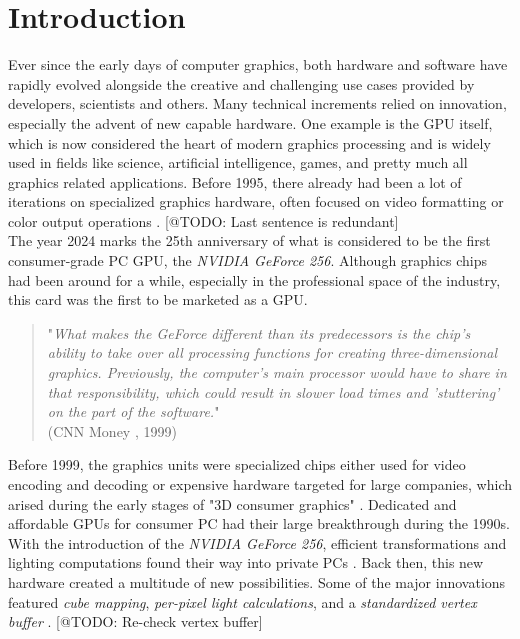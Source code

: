 \chapter{Introduction} \label{cpt-introduction}

Ever since the early days of computer graphics, both hardware and software have rapidly evolved
alongside the creative and challenging use cases provided by developers, scientists and others.
Many technical increments relied on innovation, especially the advent of new capable hardware.
One example is the \ac{GPU} itself, which is now considered the heart of modern graphics 
processing and is widely used in fields like science, artificial intelligence, games, and pretty 
much all graphics related applications. Before 1995, there already had been a lot of iterations 
on specialized graphics hardware, often focused on video formatting or color output operations
\cite{Singer2023}. [@TODO: Last sentence is redundant]\\

\noindent
The year 2024 marks the 25th anniversary of what is considered to be the first consumer-grade PC 
\ac{GPU}, the \emph{NVIDIA GeForce 256}. Although graphics chips had been around for a while, 
especially in the professional space of the industry, this card was the first to be marketed 
as a \ac{GPU}. 

\begin{quote}
    "\emph{What makes the GeForce different than its predecessors is the chip's ability to take over all 
    processing functions for creating three-dimensional graphics. Previously, the computer's main 
    processor would have to share in that responsibility, which could result in slower load times 
    and 'stuttering' on the part of the software.}" \\  
    (CNN Money \cite{CNNMoney1999}, 1999)
\end{quote}

\noindent
Before 1999, the graphics units were specialized chips either used for video encoding and decoding
or expensive hardware targeted for large companies, which arised during the early stages of "3D 
consumer graphics" \cite{Singer2023}. Dedicated and affordable \ac{GPU}s for consumer \ac{PC} had 
their large breakthrough during the 1990s. With the introduction of the \emph{NVIDIA GeForce 256}, 
efficient transformations and lighting computations found their way into private \ac{PC}s 
\cite{Fenno2024}. Back then, this new hardware created a multitude of new possibilities. Some of the 
major innovations featured \emph{cube mapping}, \emph{per-pixel light calculations}, and a 
\emph{standardized vertex buffer} \cite{NVIDIA1999, Battaglia2024}. [@TODO: Re-check vertex buffer] \\

